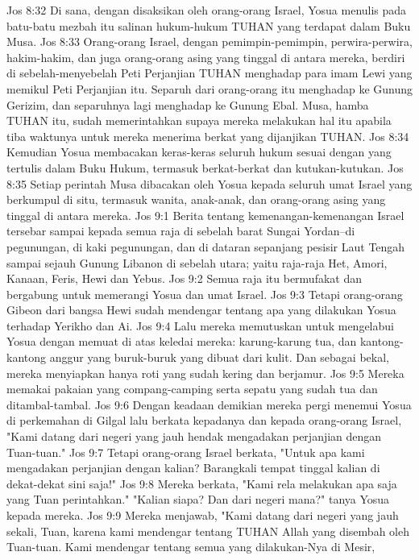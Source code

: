 Jos 8:32  Di sana, dengan disaksikan oleh orang-orang Israel, Yosua menulis pada batu-batu mezbah itu salinan hukum-hukum TUHAN yang terdapat dalam Buku Musa.
Jos 8:33  Orang-orang Israel, dengan pemimpin-pemimpin, perwira-perwira, hakim-hakim, dan juga orang-orang asing yang tinggal di antara mereka, berdiri di sebelah-menyebelah Peti Perjanjian TUHAN menghadap para imam Lewi yang memikul Peti Perjanjian itu. Separuh dari orang-orang itu menghadap ke Gunung Gerizim, dan separuhnya lagi menghadap ke Gunung Ebal. Musa, hamba TUHAN itu, sudah memerintahkan supaya mereka melakukan hal itu apabila tiba waktunya untuk mereka menerima berkat yang dijanjikan TUHAN.
Jos 8:34  Kemudian Yosua membacakan keras-keras seluruh hukum sesuai dengan yang tertulis dalam Buku Hukum, termasuk berkat-berkat dan kutukan-kutukan.
Jos 8:35  Setiap perintah Musa dibacakan oleh Yosua kepada seluruh umat Israel yang berkumpul di situ, termasuk wanita, anak-anak, dan orang-orang asing yang tinggal di antara mereka.
Jos 9:1  Berita tentang kemenangan-kemenangan Israel tersebar sampai kepada semua raja di sebelah barat Sungai Yordan--di pegunungan, di kaki pegunungan, dan di dataran sepanjang pesisir Laut Tengah sampai sejauh Gunung Libanon di sebelah utara; yaitu raja-raja Het, Amori, Kanaan, Feris, Hewi dan Yebus.
Jos 9:2  Semua raja itu bermufakat dan bergabung untuk memerangi Yosua dan umat Israel.
Jos 9:3  Tetapi orang-orang Gibeon dari bangsa Hewi sudah mendengar tentang apa yang dilakukan Yosua terhadap Yerikho dan Ai.
Jos 9:4  Lalu mereka memutuskan untuk mengelabui Yosua dengan memuat di atas keledai mereka: karung-karung tua, dan kantong-kantong anggur yang buruk-buruk yang dibuat dari kulit. Dan sebagai bekal, mereka menyiapkan hanya roti yang sudah kering dan berjamur.
Jos 9:5  Mereka memakai pakaian yang compang-camping serta sepatu yang sudah tua dan ditambal-tambal.
Jos 9:6  Dengan keadaan demikian mereka pergi menemui Yosua di perkemahan di Gilgal lalu berkata kepadanya dan kepada orang-orang Israel, "Kami datang dari negeri yang jauh hendak mengadakan perjanjian dengan Tuan-tuan."
Jos 9:7  Tetapi orang-orang Israel berkata, "Untuk apa kami mengadakan perjanjian dengan kalian? Barangkali tempat tinggal kalian di dekat-dekat sini saja!"
Jos 9:8  Mereka berkata, "Kami rela melakukan apa saja yang Tuan perintahkan." "Kalian siapa? Dan dari negeri mana?" tanya Yosua kepada mereka.
Jos 9:9  Mereka menjawab, "Kami datang dari negeri yang jauh sekali, Tuan, karena kami mendengar tentang TUHAN Allah yang disembah oleh Tuan-tuan. Kami mendengar tentang semua yang dilakukan-Nya di Mesir,
